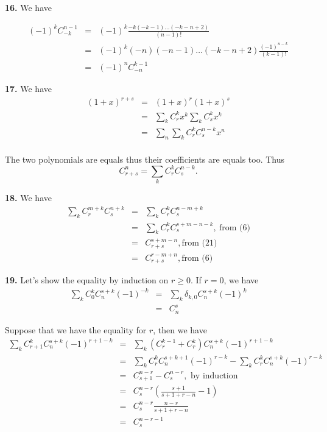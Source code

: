 \documentclass[a4paper,12pt]{article}
\newcommand{\newpar}[1]{\bigskip \noindent \textbf{#1.}}
\begin{document}
\newpar{16} We have

\begin{eqnarray*}
  (-1)^k C_{-k}^{n-1} &=& (-1)^k \frac{-k (-k-1)\ldots
    (-k-n+2)}{(n-1)!} \\
  &=& (-1)^k (-n) (-n-1)\ldots(-k-n+2) \frac{(-1)^{n-k}}{(k-1)!} \\
  &=& (-1)^n C_{-n}^{k-1}
\end{eqnarray*}

\newpar{17} We have
\begin{eqnarray*}
  (1+x)^{r+s} &=& (1+x)^r (1+x)^s \\
  &=& \sum_k C_r^k x^k \sum_k C_s^k x^k \\
  &=& \sum_n \sum_k C_r^k C_s^{n-k} x^n \\
\end{eqnarray*}

The two polynomials are equals thus their coefficients are equals
too.  Thus
\[ C_{r+s}^n = \sum_k C_r^k C_s^{n-k}.\]

\newpar{18} We have
\begin{eqnarray*}
  \sum_k C_r^{m+k} C_s^{n+k} &=& \sum_k C_r^k C_s^{n-m+k} \\
  &=& \sum_k C_r^k C_s^{s+m-n-k},\ \mbox{from (6)} \\
  &=& C_{r+s}^{s+m-n}, \mbox{from (21)}\\
  &=& C_{r+s}^{r-m+n}, \mbox{from (6)}
\end{eqnarray*}

\newpar{19} Let's show the equality by induction on $r \ge 0$.  If
$r=0$, we have
\begin{eqnarray*}
  \sum_k C_0^k C_n^{s+k}(-1)^{-k} &=& \sum_k \delta_{k,0}
  C_n^{s+k}(-1)^{k} \\
  &=& C_n^s
\end{eqnarray*}

Suppose that we have the equality for $r$, then we have
\begin{eqnarray*}
  \sum_k C_{r+1}^k C_n^{s+k}(-1)^{r+1-k} &=&
  \sum_k \left( C_r^{k-1} + C_r^k \right) C_n^{s+k} (-1)^{r+1-k} \\
  &=& \sum_k C_r^k C_n^{s+k+1} (-1)^{r-k} - \sum_k C_r^k C_n^{s+k}
  (-1)^{r-k} \\
  &=& C_{s+1}^{n-r} - C_s^{n-r},\mbox{ by induction} \\
  &=& C_s^{n-r} \left( \frac{s+1}{s+1+r-n} - 1 \right) \\
  &=& C_s^{n-r} \frac{n-r}{s+1+r-n} \\
  &=& C_s^{n-r-1}
\end{eqnarray*}
\end{document}
